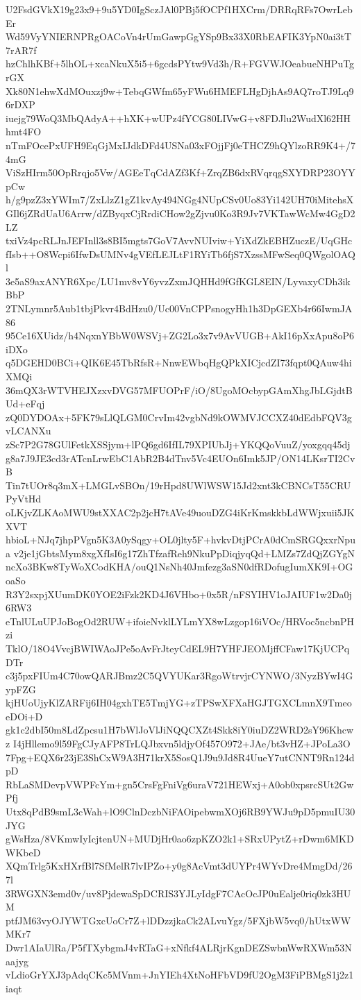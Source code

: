 U2FsdGVkX19g23x9+9u5YD0IgSczJAl0PBj5fOCPf1HXCrm/DRRqRFs7OwrLebEr
Wd59VyYNIERNPRgOACoVn4rUmGawpGgYSp9Bx33X0RbEAFIK3YpN0ai3tT7rAR7f
hzChlhKBf+5lhOL+xcaNkuX5i5+6gcdsPYtw9Vd3h/R+FGVWJOeabueNHPuTgrGX
Xk80N1ehwXdMOuxzj9w+TebqGWfm65yFWu6HMEFLHgDjhAs9AQ7roTJ9Lq96rDXP
iuejg79WoQ3MbQAdyA++hXK+wUPz4fYCG80LIVwG+v8FDJlu2WudXl62HHhmt4FO
nTmFOcePxUFH9EqGjMxIJdkDFd4USNa03xFOjjFj0eTHCZ9hQYlzoRR9K4+/74mG
ViSzHIrm50OpRrqjo5Vw/AGEeTqCdAZf3Kf+ZrqZB6dxRVqrqgSXYDRP23OYYpCw
h/g9pzZ3xYWIm7/ZxLlzZ1gZ1kvAy494NGg4NUpCSv0Uo83Yi142UH70iMitehsX
GIl6jZRdUaU6Arrw/dZByqxCjRrdiCHow2gZjvu0Ko3R9Jv7VKTawWcMw4GgD2LZ
txiVz4pcRLJnJEFInll3s8BI5mgts7GoV7AvvNUIviw+YiXdZkEBHZuczE/UqGHc
fIsb++O8Wcpi6IfwDsUMNv4gVEfLEJLtF1RYiTb6fjS7XzssMFwSeq0QWgolOAQl
3e5aS9axANYR6Xpc/LU1mv8vY6yvzZxmJQHHd9fGfKGL8EIN/LyvaxyCDh3ikBbP
2TNLymnr5Aub1tbjPkvr4BdHzu0/Uc00VnCPPsnogyHh1h3DpGEXb4r66IwmJA86
95Ce16XUidz/h4NqxnYBbW0WSVj+ZG2Lo3x7v9AvVUGB+AkI16pXxApu8oP6iDXo
q5DGEHD0BCi+QIK6E45TbRfsR+NnwEWbqHgQPkXICjcdZI73fqpt0QAuw4hiXMQi
36mQX3rWTVHEJXzxvDVG57MFUOPrF/iO/8UgoMOcbypGAmXhgJbLGjdtBUd+eFqj
zQ0DYDOAx+5FK79sLlQLGM0CrvIm42vgbNd9kOWMVJCCXZ40dEdbFQV3gvLCANXu
zSc7P2G78GUlFetkXSSjym+lPQ6gd6IfIL79XPIUbJj+YKQQoVuuZ/yoxgqq45dj
g8a7J9JE3cd3rATcnLrwEbC1AbR2B4dTnv5Vc4EUOn6Imk5JP/ON14LKsrTI2CvB
Tin7tUOr8q3mX+LMGLvSBOn/19rHpd8UWlWSW15Jd2xnt3kCBNCsT55CRUPyVtHd
oLKjvZLKAoMWU9stXXAC2p2jcH7tAVe49uouDZG4iKrKmskkbLdWWjxuii5JKXVT
hbioL+NJq7jhpPVgn5K3A0ySqgy+OL0jlty5F+hvkvDtjPCrA0dCmSRGQxxrNpua
v2je1jGbtsMym8xgXfIsI6g17ZhTfzafReh9NkuPpDiqjyqQd+LMZs7ZdQjZGYgN
ncXo3BKw8TyWoXCodKHA/ouQ1NsNh40Jmfezg3aSN0dfRDofugIumXK9I+OGoaSo
R3Y2sxpjXUumDK0YOE2iFzk2KD4J6VHbo+0x5R/nFSYIHV1oJAIUF1w2Da0j6RW3
eTnlULuUPJoBogOd2RUW+ifoieNvklLYLmYX8wLzgop16iVOc/HRVoc5ncbnPHzi
TklO/18O4VvcjBWIWAoJPe5oAvFrJteyCdEL9H7YHFJEOMjffCFaw17KjUCPqDTr
c3j5pxFIUm4C70owQARJBmz2C5QVYUKar3RgoWtrvjrCYNWO/3NyzBYwI4GypFZG
kjHUoUjyKlZARFij6IH04gxhTE5TmjYG+zTPSwXFXaHGJTGXCLmnX9TmeoeDOi+D
gk1c2dbI50m8LdZpcsu1H7bWlJoVlJiNQQCXZt4Skk8iY0iuDZ2WRD2sY96Khcwz
I4jHllemo9l59FgCJyAFP8TrLQJbxvn5ldjyOf457O972+JAe/bt3vHZ+JPoLa3O
7Fpg+EQX6r23jE3ShCxW9A3H71krX5SosQ1J9u9Jd8R4UueY7utCNNT9Rn124dpD
RbLaSMDevpVWPFcYm+gn5CrsFgFniVg6uraV721HEWxj+A0ob0xpsrcSUt2GwPfj
Utx8qPdB9smL3cWah+lO9ClnDczbNiFAOipebwmXOj6RB9YWJu9pD5pmuIU30JYG
gWsHza/8VKmwIyIcjtenUN+MUDjHr0ao6zpKZO2k1+SRxUPytZ+rDwm6MKDWKbeD
XQmTrlg5KxHXrfBl7SfMelR7lvIPZo+y0g8AcVmt3dUYPr4WYvDre4MmgDd/267l
3RWGXN3emd0v/uv8PjdewaSpDCRIS3YJLyIdgF7CAcOcJP0uEalje0riq0zk3HUM
ptfJM63vyOJYWTGxcUoCr7Z+lDDzzjkaCk2ALvuYgz/5FXjbW5vq0/hUtxWWMKr7
Dwr1AIaUlRa/P5fTXybgmJ4vRTaG+xNfkf4ALRjrKgnDEZSwbnWwRXWm53Naajyg
vLdioGrYXJ3pAdqCKc5MVnm+JnYIEh4XtNoHFbVD9fU2OgM3FiPBMgS1j2z1iaqt
